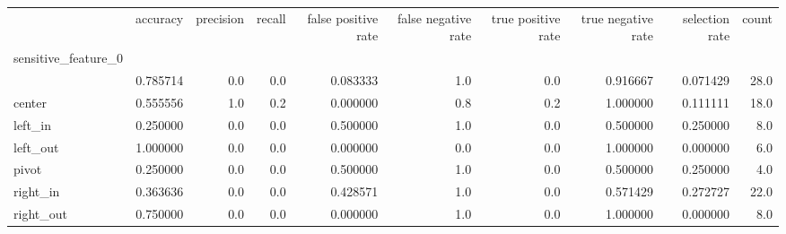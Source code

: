 \begin{tabular}{lrrrrrrrrr}
\toprule
{} &  accuracy &  precision &  recall &  false positive rate &  false negative rate &  true positive rate &  true negative rate &  selection rate &  count \\
sensitive\_feature\_0 &           &            &         &                      &                      &                     &                     &                 &        \\
\midrule
                    &  0.785714 &        0.0 &     0.0 &             0.083333 &                  1.0 &                 0.0 &            0.916667 &        0.071429 &   28.0 \\
center              &  0.555556 &        1.0 &     0.2 &             0.000000 &                  0.8 &                 0.2 &            1.000000 &        0.111111 &   18.0 \\
left\_in             &  0.250000 &        0.0 &     0.0 &             0.500000 &                  1.0 &                 0.0 &            0.500000 &        0.250000 &    8.0 \\
left\_out            &  1.000000 &        0.0 &     0.0 &             0.000000 &                  0.0 &                 0.0 &            1.000000 &        0.000000 &    6.0 \\
pivot               &  0.250000 &        0.0 &     0.0 &             0.500000 &                  1.0 &                 0.0 &            0.500000 &        0.250000 &    4.0 \\
right\_in            &  0.363636 &        0.0 &     0.0 &             0.428571 &                  1.0 &                 0.0 &            0.571429 &        0.272727 &   22.0 \\
right\_out           &  0.750000 &        0.0 &     0.0 &             0.000000 &                  1.0 &                 0.0 &            1.000000 &        0.000000 &    8.0 \\
\bottomrule
\end{tabular}
